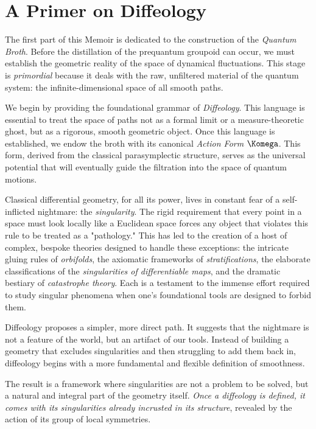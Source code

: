 \chapter{A Primer on Diffeology}
\label{chap:A Primer on Diffeology}

The first part of this Memoir is dedicated to the construction of the \emph{Quantum Broth}.
Before the distillation of the prequantum groupoid can occur,
we must establish the geometric reality of the space of dynamical fluctuations.
This stage is \emph{primordial} because it deals with the raw,
unfiltered material of the quantum system:
the infinite-dimensional space of all smooth paths.

We begin by providing the foundational grammar of \emph{Diffeology}.
This language is essential to treat the space of paths not as a formal limit or a measure-theoretic ghost,
but as a rigorous,
smooth geometric object.
Once this language is established,
we endow the broth with its canonical \emph{Action Form} $\Komega$.
This form,
derived from the classical parasymplectic structure,
serves as the universal potential that will eventually guide the filtration into the space of quantum motions.

Classical differential geometry,
for all its power,
lives in constant fear of a self-inflicted nightmare:
the \emph{singularity}.
The rigid requirement that every point in a space must look locally like a Euclidean space forces any object that violates this rule to be treated as a "pathology."
This has led to the creation of a host of complex,
bespoke theories designed to handle these exceptions:
the intricate gluing rules of \emph{orbifolds},
the axiomatic frameworks of \emph{stratifications},
the elaborate classifications of the \emph{singularities of differentiable maps},
and the dramatic bestiary of \emph{catastrophe theory}.
Each is a testament to the immense effort required to study singular phenomena when one's foundational tools are designed to forbid them.

Diffeology proposes a simpler,
more direct path.
It suggests that the nightmare is not a feature of the world,
but an artifact of our tools.
Instead of building a geometry that excludes singularities and then struggling to add them back in,
diffeology begins with a more fundamental and flexible definition of smoothness.

The result is a framework where singularities are not a problem to be solved,
but a natural and integral part of the geometry itself.
\emph{Once a diffeology is defined,
it comes with its singularities already incrusted in its structure},
revealed by the action of its group of local symmetries.

